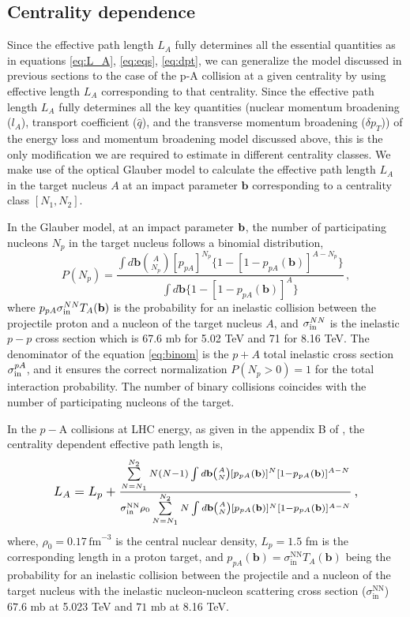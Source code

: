 \documentclass[11pt,onecolumn]{article}
\newcommand{\beq}{\begin{equation}}
\newcommand{\eeq}{\end{equation}}
\begin{document}
\subsection{Centrality dependence}
%
Since the effective path length $L_A$ fully determines all the essential quantities as in equations \eqref{eq:L_A}, \eqref{eq:eqs}, \eqref{eq:dpt}, we can generalize the model discussed in previous sections to the case of the p-A collision at a given centrality by using effective length $L_A$ corresponding to that centrality.
Since the effective path length $L_A$ fully determines all the key quantities (nuclear momentum broadening ($l_A$), transport coefficient ($\hat{q}$), and the transverse momentum broadening ($\delta p_T$)) of the energy loss and momentum broadening model discussed above, this is the only modification we are required to estimate in different centrality classes. We make use of the optical Glauber model to calculate the effective path length $L_A$ in the target nucleus $A$ at an impact parameter $\textbf{b}$ corresponding to a centrality class $[N_1,N_2]$.

In the Glauber model, at an impact parameter $\bf b$, the number of participating nucleons $N_p$ in the target nucleus follows a binomial distribution,
\beq
P(N_p) = \frac{\int d \textbf{b} \binom{A}{N_p} [p_{pA}]^{N_p} \{ 1-[1-p_{pA}(\textbf{b})]^{A-N_p}\}}{\int d \textbf{b} \{ 1-[1-p_{pA}(\textbf{b})]^A\}} \, ,
\label{eq:binom}
\eeq
%
where $p_{pA} \sigma_{\rm in}^{NN} T_A(\textbf{b})$ is the probability for an inelastic collision between the projectile proton and a nucleon of the target nucleus $A$, and $\sigma_{\rm in}^{NN}$ is the inelastic $p-p$ cross section which is 67.6 mb for 5.02 TeV and 71 for 8.16 TeV. The denominator of the equation \eqref{eq:binom} is the $p+A$ total inelastic cross section $\sigma^{pA}_{\rm in}$, and it ensures the correct normalization $P(N_p>0)=1$ for the total interaction probability. The number of binary collisions coincides with the number of participating nucleons of the target.

In  the $p-$A collisions at LHC energy, as given in the appendix B of \cite{Arleo:2013zua}, the centrality dependent effective path length is,
\beq
\resizebox{.8\hsize}{!}{$
L_A = L_p + \frac{\sum\limits_{N=N_1}^{N_2} N(N-1) \int d\textbf{b} \binom{A}{N} [p_{pA}(\textbf{b})]^{N} [1-p_{pA}(\textbf{b})]^{A-N} }{\sigma^{\text{NN}}_{\text{in}} \rho_0 \sum\limits_{N=N_1}^{N_2} N \int d\textbf{b} \binom{A}{N} [p_{pA}(\textbf{b})]^{N} [1-p_{pA}(\textbf{b})]^{A-N}} \, ,
\label{eq:LeffLHC}
$}
\eeq
%
where, $\rho_0 = 0.17 \, \text{fm}^{-3}$ is the central nuclear density, $L_p = 1.5$ fm is the corresponding length in a proton target, and $p_{pA} (\textbf{b}) = \sigma^{\text{NN}}_{\text{in}} T_A(\textbf{b})$ being the probability for an inelastic collision between the projectile and a nucleon of the target nucleus with the inelastic nucleon-nucleon scattering cross section  ($\sigma^{\text{NN}}_{\text{in}}$) $67.6 $ mb at 5.023 TeV and $71$ mb at 8.16 TeV.
\end{document}
